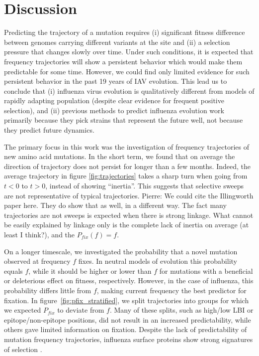 \documentclass[reprint,amsmath,amssymb,superscriptaddress,showpacs,rmp]{revtex4-1}
\newcommand{\pierre}[1]{{\color{red}Pierre: #1}}
\begin{document}

\section*{Discussion} %
\label{sec:discussion}

Predicting the trajectory of a mutation requires (i) significant fitness difference between genomes carrying different variants at the site and (ii) a selection pressure that changes slowly over time.
Under such conditions, it is expected that frequency trajectories will show a persistent behavior which would make them predictable for some time.
However, we could find only limited evidence for such persistent behavior in the past 19 years of IAV evolution.
This lead us to conclude that (i) influenza virus evolution is qualitatively different from models of rapidly adapting population (despite clear evidence for frequent positive selection), and (ii) previous methods to predict influenza evolution work primarily because they pick strains that represent the future well, not because they predict future dynamics.

The primary focus in this work was the investigation of frequency trajectories of new amino acid mutations.
In the short term, we found that on average the direction of trajectory does not persist for longer than a few months.
Indeed, the average trajectory in figure \ref{fig:trajectories} takes a sharp turn when going from $t<0$ to $t>0$, instead of showing ``inertia''.
This suggests that selective sweeps are not representative of typical trajectories. \pierre{We could cite the Illingworth paper here. They do show that as well, in a different way. The fact many trajectories are not sweeps is expected when there is strong linkage. What cannot be easily explained by linkage only is the complete lack of inertia on average (at least I think?), and the $P_{fix}(f)=f$. }

On a longer timescale, we investigated the probability that a novel mutation observed at frequency $f$ fixes.
In neutral models of evolution this probability equals $f$, while it should be higher or lower than $f$ for mutations with a beneficial or deleterious effect on fitness, respectively.
However, in the case of influenza, this probability differs little from $f$, making current frequency the best predictor for fixation.
In figure~\ref{fig:pfix_stratified}, we split trajectories into groups for which we expected $P_{fix}$ to deviate from $f$.
Many of these splits, such as high/low LBI or epitope/non-epitope positions, did not result in an increased predictability, while others gave limited information on fixation.
Despite the lack of predictability of mutation frequency trajectories, influenza surface proteins show strong signatures of selection \citep{bhatt_genomic_2011,strelkowa_clonal_2012}.
\end{document}
